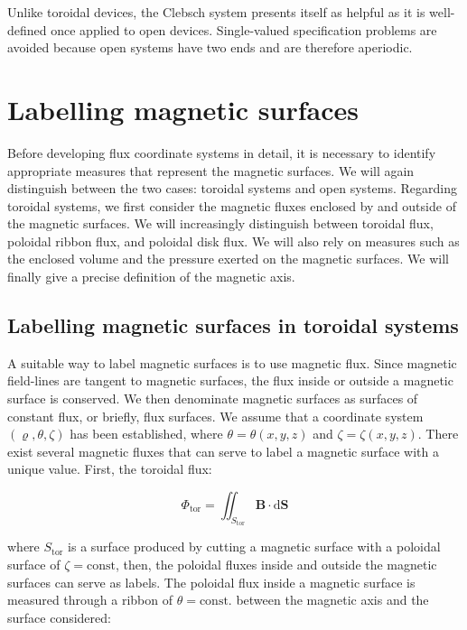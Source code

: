 \quad Unlike toroidal devices, the Clebsch system presents itself as helpful as it is well-defined once applied to open devices. Single-valued specification problems are avoided because open systems have two ends and are therefore aperiodic.

\section{Labelling magnetic surfaces}

Before developing flux coordinate systems in detail, it is necessary to identify appropriate measures that represent the magnetic surfaces. We will again distinguish between the two cases: toroidal systems and open systems. Regarding toroidal systems, we first consider the magnetic fluxes enclosed by and outside of the magnetic surfaces. We will increasingly distinguish between toroidal flux, poloidal ribbon flux, and poloidal disk flux. We will also rely on measures such as the enclosed volume and the pressure exerted on the magnetic surfaces. We will finally give a precise definition of the magnetic axis.

\subsection{Labelling magnetic surfaces in toroidal systems}

A suitable way to label magnetic surfaces is to use magnetic flux. Since magnetic field-lines are tangent to magnetic surfaces, the flux inside or outside a magnetic surface is conserved. We then denominate magnetic surfaces as surfaces of constant flux, or briefly, flux surfaces. We assume that a coordinate system $(\varrho,\theta,\zeta)$ has been established, where $\theta=\theta(x,y,z)$ and $\zeta=\zeta(x,y,z)$. There exist several magnetic fluxes that can serve to label a magnetic surface with a unique value. First, the toroidal flux:

\begin{equation}
    \Phi_\text{tor}=\iint_{S_\text{tor}}\mathbf{B}\cdot\mathrm{d}\mathbf{S}
\end{equation}

where $S_\text{tor}$ is a surface produced by cutting a magnetic surface with a poloidal surface of $\zeta=\text{const}$, then, the poloidal fluxes inside and outside the magnetic surfaces can serve as labels. The poloidal flux inside a magnetic surface is measured through a ribbon of $\theta=\text{const.}$ between the magnetic axis and the surface considered:

